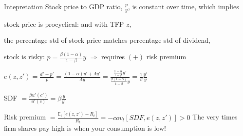 \documentclass[aspectratio=169,xcolor=dvipsnames]{beamer}
\let\tempone\itemize
\let\temptwo\enditemize
\renewenvironment{itemize}{\tempone\addtolength{\itemsep}{\fill}}{\temptwo}
\let\tempa\enumerate
\let\tempb\endenumerate
\renewenvironment{enumerate}{\tempa\addtolength{\itemsep}{\fill}}{\tempb}
\begin{document}
\begin{frame}{Intepretation}
\label{slide:Intepretation}
    Stock price to GDP ratio, $ \frac{p}{y} $, is constant over time, which implies
    \begin{enumerate}
        \item stock price is procyclical: \faArrowCircleUp \hspace{1px} and \faArrowCircleDown \hspace{1px} with TFP $ z $,
        \item the percentage std of stock price matches percentage std of dividend,
        \item stock is risky: $ \displaystyle p = \frac{\beta(1-\alpha)}{1-\beta} y $ $ \Rightarrow  $ requires $ (+) $ risk premium
        \begin{itemize}
            \item $ \displaystyle e(z, z') = \frac{d'+p'}{p} = \frac{(1-\alpha)y' + \Lambda y'}{\Lambda y} = \frac{\frac{1-\alpha}{1-\beta}y'}{ \frac{\beta(1-\alpha)}{1-\beta} y} = \frac{1}{\beta} \frac{y'}{y}$
            \item SDF $ \displaystyle = \frac{\beta u'(c')}{u'(c)} = \beta \frac{y}{y'} $
            \item Risk premium $ \displaystyle = \frac{\mathbb{E}_{t}[e(z, z') - R_{t}]}{R_{t}} = - cov_{t} \left[
                SDF, e(z, z')
            \right] > 0$
        \end{itemize}
    \end{enumerate}
    The very times firm shares pay high is when your consumption is low!
\end{frame}


%
%
\end{document}

